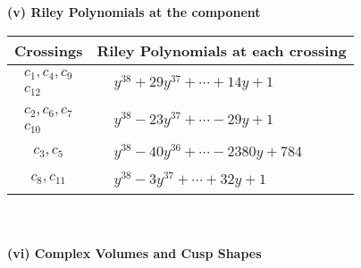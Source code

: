 \documentclass[1p]{elsarticle_modified}
\theoremstyle{definition}
\begin{document}
\newpage\renewcommand{\arraystretch}{1}
\flushleft \textbf{(v) Riley Polynomials at the component}\newline \\
\begin{tabular}{m{50pt}|m{274pt}}
Crossings & \hspace{64pt}Riley Polynomials at each crossing \\
\hline $$\begin{aligned}c_{1},c_{4},c_{9}\\c_{12}\end{aligned}$$&$\begin{aligned}
&y^{38}+29 y^{37}+\cdots+14 y+1
\end{aligned}$\\
\hline $$\begin{aligned}c_{2},c_{6},c_{7}\\c_{10}\end{aligned}$$&$\begin{aligned}
&y^{38}-23 y^{37}+\cdots-29 y+1
\end{aligned}$\\
\hline $$\begin{aligned}c_{3},c_{5}\end{aligned}$$&$\begin{aligned}
&y^{38}-40 y^{36}+\cdots-2380 y+784
\end{aligned}$\\
\hline $$\begin{aligned}c_{8},c_{11}\end{aligned}$$&$\begin{aligned}
&y^{38}-3 y^{37}+\cdots+32 y+1
\end{aligned}$\\
\hline
\end{tabular}\\~\\
\newpage\flushleft \textbf{(vi) Complex Volumes and Cusp Shapes}
\end{document}
